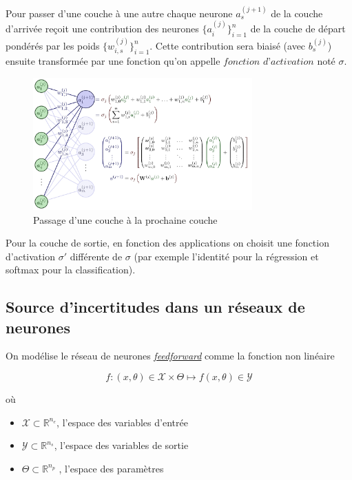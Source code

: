\documentclass[french,12pt]{article}
\begin{document}
Pour passer d'une couche à une autre chaque neurone $a^{(j + 1)}_s$ de la couche d'arrivée reçoit une contribution
des neurones $\{a^{(j)}_i\}_{i = 1}^n$ de la couche de départ pondérés par les poids
$\{w^{(j)}_{i,s}\}_{i = 1}^n$. Cette contribution sera biaisé (avec $b^{(j)}_s$) ensuite transformée par une fonction
qu'on appelle $\textit{fonction d'activation}$ noté $\sigma$.

\begin{figure}[H]
    \centerline{\includegraphics[width = 0.75\textwidth]{FNN/Images/fnnDetails/fnnDetails_page-0001.jpg}}
    \caption{Passage d'une couche à la prochaine couche \cite{NeetGraph}}
    \label{fig:fnnDetails}
\end{figure}

Pour la couche de sortie, en fonction des applications on choisit une fonction d'activation $\sigma'$
différente de $\sigma$ (par exemple l'identité pour la régression et softmax pour la classification).

\subsection{Source d'incertitudes dans un réseaux de neurones}

On modélise le réseau de neurones \href{https://en.wikipedia.org/wiki/Feedforward_neural_network}{\textit{feedforward}} comme la fonction non linéaire

$$f : (x, \theta) \in \mathcal{X} \times \Theta \mapsto f(x, \theta) \in \mathcal{Y}$$

où

\begin{itemize}
    \item $\mathcal{X} \subset \mathbb{R}^{n_e}$, l'espace des variables d'entrée
    \item $\mathcal{Y} \subset \mathbb{R}^{n_s}$, l'espace des variables de sortie
    \item $\Theta \subset \mathbb{R}^{n_p}$ , l'espace des paramètres
\end{itemize}
\end{document}
